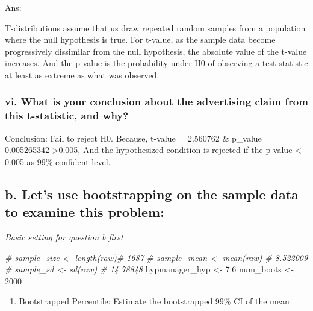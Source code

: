 \documentclass[
]{article}
\newenvironment{Shaded}{\begin{snugshade}}{\end{snugshade}}
\newcommand{\CommentTok}[1]{\textcolor[rgb]{0.56,0.35,0.01}{\textit{#1}}}
\newcommand{\DecValTok}[1]{\textcolor[rgb]{0.00,0.00,0.81}{#1}}
\newcommand{\FloatTok}[1]{\textcolor[rgb]{0.00,0.00,0.81}{#1}}
\newcommand{\NormalTok}[1]{#1}
\newcommand{\OtherTok}[1]{\textcolor[rgb]{0.56,0.35,0.01}{#1}}
\providecommand{\tightlist}{%
  \setlength{\itemsep}{0pt}\setlength{\parskip}{0pt}}
\begin{document}
Ans:

T-distributions assume that us draw repeated random samples from a
population where the null hypothesis is true. For t-value, as the sample
data become progressively dissimilar from the null hypothesis, the
absolute value of the t-value increases. And the p-value is the
probability under H0 of observing a test statistic at least as extreme
as what was observed.

\hypertarget{vi.-what-is-your-conclusion-about-the-advertising-claim-from-this-t-statistic-and-why}{%
\subsubsection{vi. What is your conclusion about the advertising claim
from this t-statistic, and
why?}\label{vi.-what-is-your-conclusion-about-the-advertising-claim-from-this-t-statistic-and-why}}

Conclusion: Fail to reject H0. Because, t-value = 2.560762 \& p\_value =
0.005265342 \textgreater0.005, And the hypothesized condition is
rejected if the p-value \textless{} 0.005 as 99\% confident level.

\hypertarget{b.-lets-use-bootstrapping-on-the-sample-data-to-examine-this-problem}{%
\subsection{b. Let's use bootstrapping on the sample data to examine
this
problem:}\label{b.-lets-use-bootstrapping-on-the-sample-data-to-examine-this-problem}}

\emph{Basic setting for question b first}

\begin{Shaded}
\begin{Highlighting}[]
\CommentTok{\# sample\_size \textless{}{-} length(raw)\# 1687}
\CommentTok{\# sample\_mean \textless{}{-} mean(raw) \# 8.522009}
\CommentTok{\# sample\_sd \textless{}{-} sd(raw) \# 14.78848}
\NormalTok{hypmanager\_hyp }\OtherTok{\textless{}{-}} \FloatTok{7.6}
\NormalTok{num\_boots }\OtherTok{\textless{}{-}} \DecValTok{2000}
\end{Highlighting}
\end{Shaded}

\begin{enumerate}
\def\labelenumi{\roman{enumi}.}
\tightlist
\item
  Bootstrapped Percentile: Estimate the bootstrapped 99\% CI of the mean
\end{enumerate}
\end{document}
